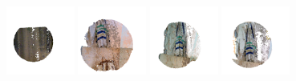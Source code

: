 \documentclass[11pt,a4paper]{kth-mag}
\begin{document}
\begin{figure}
{{      \includegraphics[width=0.2\textwidth]{images/queryresults/hanger_jacket_1}
      \includegraphics[width=0.2\textwidth]{images/queryresults/hanger_jacket_2}
      \includegraphics[width=0.2\textwidth]{images/queryresults/hanger_jacket_3}
      \includegraphics[width=0.2\textwidth]{images/queryresults/hanger_jacket_4}
    }\\
  }
  \centerline{
    }
\end{figure}
\end{document}
